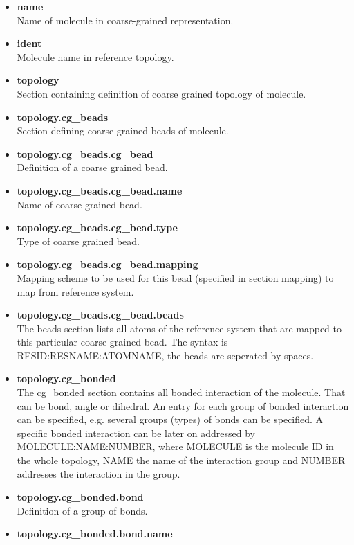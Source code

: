 \begin{itemize}
\item \textbf{name} \\
      Name of molecule in coarse-grained representation.
\item \textbf{ident} \\
      Molecule name in reference topology.
\item \textbf{topology} \\
      Section containing definition of coarse grained topology of molecule.
\item \textbf{topology.cg\_beads} \\
      Section defining coarse grained beads of molecule.
\item \textbf{topology.cg\_beads.cg\_bead} \\
      Definition of a coarse grained bead.
\item \textbf{topology.cg\_beads.cg\_bead.name} \\
      Name of coarse grained bead.
\item \textbf{topology.cg\_beads.cg\_bead.type} \\
      Type of coarse grained bead.
\item \textbf{topology.cg\_beads.cg\_bead.mapping} \\
      Mapping scheme to be used for this bead (specified in section mapping) to map from reference system.
\item \textbf{topology.cg\_beads.cg\_bead.beads} \\
      The beads section lists all atoms of the reference system that are mapped to this particular
      coarse grained bead. The syntax is RESID:RESNAME:ATOMNAME, the beads are seperated by spaces.
\item \textbf{topology.cg\_bonded} \\
      The cg\_bonded section contains all bonded interaction of the molecule. That can be bond, angle or dihedral.
      An entry for each group of bonded interaction can be specified, e.g. several groups (types) of bonds can be specified.
      A specific bonded interaction can be later on addressed by MOLECULE:NAME:NUMBER, where MOLECULE is the molecule ID in
      the whole topology, NAME the name of the interaction group and NUMBER addresses the interaction in the group.
\item \textbf{topology.cg\_bonded.bond} \\
      Definition of a group of bonds.
\item \textbf{topology.cg\_bonded.bond.name} \\

\end{itemize}
